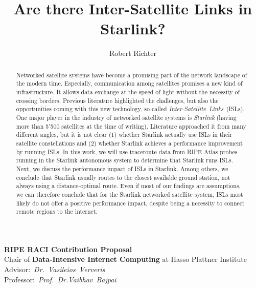 \documentclass[a4, 12pt]{article}
\begin{document}
\author{Robert Richter}
\title{Are there Inter-Satellite Links in Starlink?}
\maketitle


\noindent
\textbf{RIPE RACI Contribution Proposal} \\
Chair of \textbf{Data-Intensive Internet Computing} at Hasso Plattner Institute \\

\noindent
Advisor:~\textit{Dr.~Vasileios~Ververis} \\
Professor:~\textit{Prof.~Dr.Vaibhav~Bajpai}

\begin{abstract}

	Networked satellite systems have become a promising part of the network landscape of the modern time.
	Especially, communication among satellites promises a new kind of infrastructure. It allows data exchange at the speed of light without the necessity of crossing borders. Previous literature highlighted the challenges, but also the opportunities coming with this new technology, so-called \textit{Inter-Satellite~Links}~(ISLs).
	One major player in the industry of networked satellite systems is \textit{Starlink} (having more than 5'500 satellites at the time of writing). Literature approached it from many different angles, but it is not clear (1) whether Starlink actually use ISLs in their satellite constellations and (2) whether Starlink achieves a performance improvement by running ISLs.
	In this work, we will use traceroute data from RIPE Atlas probes running in the Starlink autonomous system to determine that Starlink runs ISLs. Next, we discuss the performance impact of ISLs in Starlink. Among others, we conclude that Starlink usually routes to the closest available ground station, not always using a distance-optimal route. Even if most of our findings are assumptions, we can therefore conclude that for the Starlink networked satellite system, ISLs most likely do not offer a positive performance impact, despite being a necessity to connect remote regions to the internet.

\end{abstract}
\end{document}
